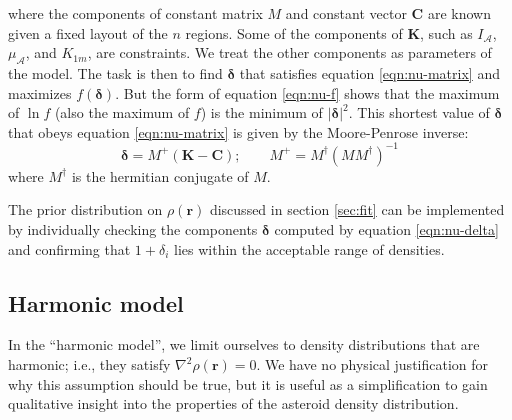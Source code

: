 where the components of constant matrix $M$ and constant vector $\bm C$ are known given a fixed layout of the $n$ regions. Some of the components of $\bm K$, such as $I_\mathcal{A}$, $\mu_\mathcal{A}$, and $K_{1m}$, are constraints. We treat the other components as parameters of the model. The task is then to find $\bm \delta$ that satisfies equation \ref{eqn:nu-matrix} and maximizes $f(\bm \delta)$. But the form of equation \ref{eqn:nu-f} shows that the maximum of $\ln f$ (also the maximum of $f$) is the minimum of $|\bm \delta|^2$. This shortest value of $\bm \delta$ that obeys equation \ref{eqn:nu-matrix} is given by the Moore-Penrose inverse:
\begin{equation}
  \bm \delta = M^+ (\bm K - \bm C); \qquad M^+ = M^\dagger(M M^\dagger)^{-1}
  \label{eqn:nu-delta}
\end{equation}
where $M^\dagger$ is the hermitian conjugate of $M$.

The prior distribution on $\rho(\bm r)$ discussed in section \ref{sec:fit} can be implemented by individually checking the components $\bm \delta$ computed by equation \ref{eqn:nu-delta} and confirming that $1 + \delta_i$ lies within the acceptable range of densities.


\subsection{Harmonic model}
In the ``harmonic model'', we limit ourselves to density distributions that are harmonic; i.e., they satisfy $\nabla^2 \rho(\bm r) = 0$. We have no physical justification for why this assumption should be true, but it is useful as a simplification to gain qualitative insight into the properties of the asteroid density distribution.

